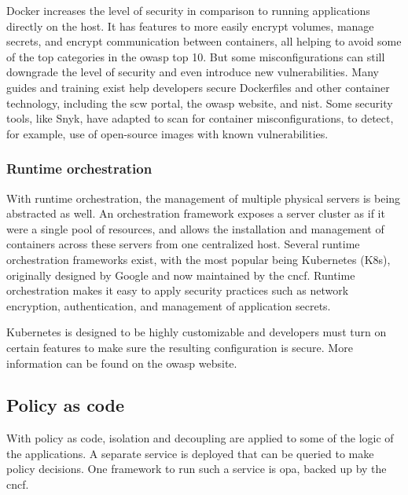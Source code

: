 Docker increases the level of security in comparison to running applications directly on the host.
It has features to more easily encrypt volumes, manage secrets, and encrypt communication between containers, all helping to avoid some of the top categories in the \gls{owasp} top 10.
But some misconfigurations can still downgrade the level of security and even introduce new vulnerabilities.
Many guides and training exist help developers secure Dockerfiles and other container technology, including the \gls{scw} portal, the \gls{owasp} website, and \gls{nist}.
Some security tools, like Snyk, have adapted to scan for container misconfigurations, to detect, for example, use of open-source images with known vulnerabilities.

\subsubsection{Runtime orchestration}
With runtime orchestration, the management of multiple physical servers is being abstracted as well.
An orchestration framework exposes a server cluster as if it were a single pool of resources, and allows the installation and management of containers across these servers from one centralized host.
Several runtime orchestration frameworks exist, with the most popular being Kubernetes (K8s), originally designed by Google and now maintained by the 
\gls{cncf}.
Runtime orchestration makes it easy to apply security practices such as network encryption, authentication, and management of application secrets. 

Kubernetes is designed to be highly customizable and developers must turn on certain features to make sure the resulting configuration is secure.
More information can be found on the \gls{owasp} website.

\subsection{Policy as code}
With policy as code, isolation and decoupling are applied to some of the logic of the applications.
A separate service is deployed that can be queried to make policy decisions.
One framework to run such a service is \gls{opa}, backed up by the \gls{cncf}.


